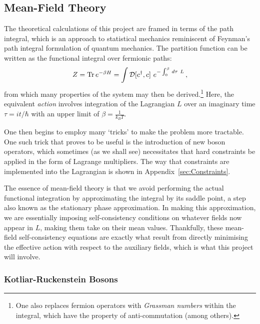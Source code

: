 \subsection{Mean-Field Theory}

The theoretical calculations of this project are framed in terms of the path integral, which is an approach to statistical mechanics reminiscent of Feynman's path integral formulation of quantum mechanics. The partition function can be written as the functional integral over fermionic paths: $$ Z = \operatorname{Tr}{e^{- \beta H}} = \int \mathcal{D} [c^\dagger, c]~e^{-\int_{0}^{\beta} \,d\tau~L}\,, $$ from which many properties of the system may then be derived.\footnote{One also replaces fermion operators with \emph{Grassman numbers} within the integral, which have the property of anti-commutation (among others).} Here, the equivalent \emph{action} involves integration of the Lagrangian $ L $ over an imaginary time $ \tau = i t / \hbar $ with an upper limit of $ \beta = \frac{1}{k_B T} $.


One then begins to employ many `tricks' to make the problem more tractable. One such trick that proves to be useful is the introduction of new boson operators, which sometimes (as we shall see) necessitates that hard constraints be applied in the form of Lagrange multipliers. The way that constraints are implemented into the Lagrangian is shown in Appendix~\ref{sec:Constraints}.

The essence of mean-field theory is that we avoid performing the actual functional integration by approximating the integral by its saddle point, a step also known as the stationary phase approximation. In making this approximation, we are essentially imposing self-consistency conditions on whatever fields now appear in $ L $, making them take on their mean values. Thankfully, these mean-field self-consistency equations are exactly what result from directly minimising the effective action with respect to the auxiliary fields, which is what this project will involve.


\subsubsection{Kotliar-Ruckenstein Bosons}

